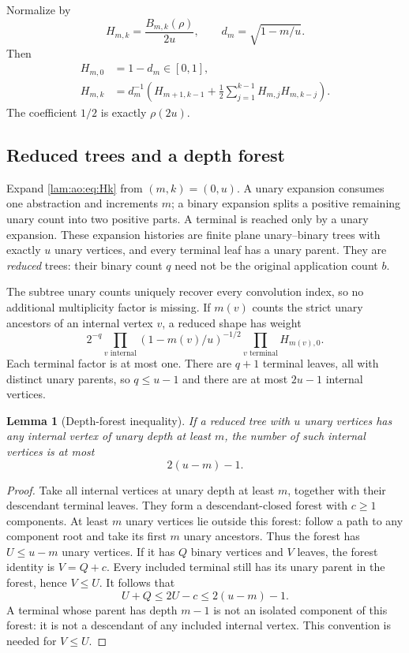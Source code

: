 \documentclass[11pt,a4paper]{article}
\numberwithin{equation}{section}
\newtheorem{lemma}[theorem]{Lemma}
\theoremstyle{remark}
\begin{document}
Normalize by
\[
 H_{m,k}=\frac{B_{m,k}(\rho)}{2u},\qquad d_m=\sqrt{1-m/u}.
\]
Then
\begin{align}
 H_{m,0}&=1-d_m\in[0,1],\label{lam:ao:eq:H0}\\
 H_{m,k}&=d_m^{-1}\left(H_{m+1,k-1}
            +\frac12\sum_{j=1}^{k-1}H_{m,j}H_{m,k-j}\right).
 \label{lam:ao:eq:Hk}
\end{align}
The coefficient $1/2$ is exactly $\rho(2u)$.

\subsection{Reduced trees and a depth forest}
Expand \eqref{lam:ao:eq:Hk} from $(m,k)=(0,u)$. A unary expansion consumes one abstraction and increments $m$; a binary expansion splits a positive remaining unary count into two positive parts. A terminal is reached only by a unary expansion. These expansion histories are finite plane unary--binary trees with exactly $u$ unary vertices, and every terminal leaf has a unary parent. They are \emph{reduced} trees: their binary count $q$ need not be the original application count $b$.

The subtree unary counts uniquely recover every convolution index, so no additional multiplicity factor is missing. If $m(v)$ counts the strict unary ancestors of an internal vertex $v$, a reduced shape has weight
\begin{equation}\label{lam:ao:eq:reduced-weight}
 2^{-q}\prod_{v\text{ internal}}(1-m(v)/u)^{-1/2}
      \prod_{v\text{ terminal}}H_{m(v),0}.
\end{equation}
Each terminal factor is at most one. There are $q+1$ terminal leaves, all with distinct unary parents, so $q\le u-1$ and there are at most $2u-1$ internal vertices.

\begin{lemma}[Depth-forest inequality]\label{lam:ao:lem:forest}
If a reduced tree with $u$ unary vertices has any internal vertex of unary depth at least $m$, the number of such internal vertices is at most
\begin{equation}\label{lam:ao:eq:forest}
 2(u-m)-1.
\end{equation}
\end{lemma}
\begin{proof}
Take all internal vertices at unary depth at least $m$, together with their descendant terminal leaves. They form a descendant-closed forest with $c\ge1$ components. At least $m$ unary vertices lie outside this forest: follow a path to any component root and take its first $m$ unary ancestors. Thus the forest has $U\le u-m$ unary vertices. If it has $Q$ binary vertices and $V$ leaves, the forest identity is $V=Q+c$. Every included terminal still has its unary parent in the forest, hence $V\le U$. It follows that
\[
 U+Q\le2U-c\le2(u-m)-1.
\]
A terminal whose parent has depth $m-1$ is not an isolated component of this forest: it is not a descendant of any included internal vertex. This convention is needed for $V\le U$.
\end{proof}
\end{document}

